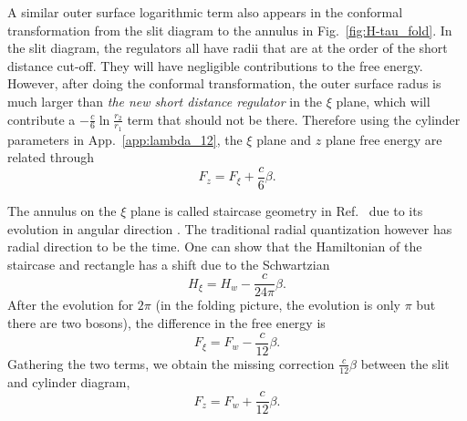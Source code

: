 A similar outer surface logarithmic term also appears in the conformal transformation from the slit diagram to the annulus in Fig.~\ref{fig:H-tau_fold}. In the slit diagram, the regulators all have radii that are at the order of the short distance cut-off. They will have negligible contributions to the free energy. However, after doing the conformal transformation, the outer surface radus is much larger than {\it the new short distance regulator} in the $\xi$ plane, which will contribute a $-\frac{c}{6} \ln \frac{r_2}{r_1}$ term that should not be there. Therefore using the cylinder parameters in App.~\ref{app:lambda_12}, the $\xi$ plane and $z$ plane free energy are related through
\begin{equation}
F_{z} = F_{\xi} + \frac{c}{6} \beta .
\end{equation}

The annulus on the $\xi$ plane is called staircase geometry in Ref.~ due to its evolution in angular direction . The traditional radial quantization however has radial direction to be the time. One can show that the Hamiltonian of the staircase and rectangle has a shift due to the Schwartzian\cite{cardy_finite-size_1988}
\begin{equation}
H_{\xi} = H_{w} - \frac{c}{24\pi} \beta .
\end{equation}
After the evolution for $2\pi$ (in the folding picture, the evolution is only $\pi$ but there are two bosons), the difference in the free energy is
\begin{equation}
F_{\xi} = F_{w} - \frac{c}{12} \beta .
\end{equation}
Gathering the two terms, we obtain the missing correction $\frac{c}{12} \beta$ between the slit and cylinder diagram, 
\begin{equation}
F_{z} = F_w + \frac{c}{12}\beta.
\end{equation}


